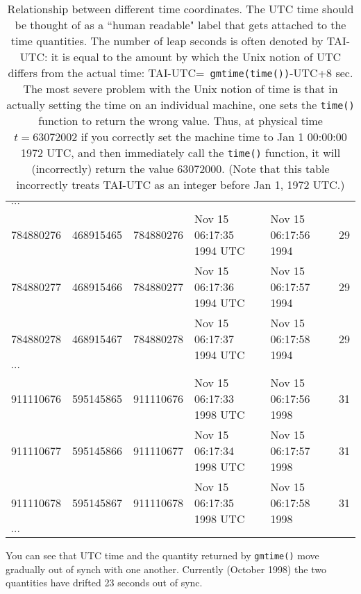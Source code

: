 \begin{table}
\begin{tabular}[]{llllll}
$\cdots$ \\
784880276	& 468915465	& 784880276	&  Nov 15 06:17:35 1994 UTC 	& Nov 15 06:17:56 1994		&	29	\\
784880277	& 468915466	& 784880277	&  Nov 15 06:17:36 1994 UTC 	& Nov 15 06:17:57 1994		&	29	\\
784880278	& 468915467	& 784880278	&  Nov 15 06:17:37 1994 UTC 	& Nov 15 06:17:58 1994		&	29	\\
$\cdots$ \\
911110676  	& 595145865	& 911110676  	&  Nov 15 06:17:33 1998 UTC 	& Nov 15 06:17:56 1998		&	31	\\
911110677  	& 595145866	& 911110677  	&  Nov 15 06:17:34 1998 UTC 	& Nov 15 06:17:57 1998		&	31	\\
911110678  	& 595145867	& 911110678  	&  Nov 15 06:17:35 1998 UTC 	& Nov 15 06:17:58 1998		&	31	\\
$\cdots$ 
\end{tabular}
\caption{\label{t:utctime} Relationship between different time
coordinates.  The UTC time should be thought of as a ``human readable"
label that gets attached to the time quantities.  The number of leap
seconds is often denoted by TAI-UTC: it is equal to the amount by
which the Unix notion of UTC differs from the actual time: TAI-UTC={\tt
gmtime(time())}-UTC+8 sec.  The most severe problem with the Unix notion
of time is that in actually setting the time on an individual machine,
one sets the {\tt time()} function to return the wrong value.  Thus,
at physical time $t=63072002$ if you correctly set the machine time to Jan 1
00:00:00 1972 UTC, and then immediately call the {\tt time()} function, it will (incorrectly)
return the value 63072000.  (Note that this table incorrectly treats
TAI-UTC as an integer before Jan 1, 1972 UTC.) }
\end{table}
You can see that UTC time and the quantity returned by {\tt gmtime()}
move gradually out of synch with one another.  Currently (October 1998)
the two quantities have drifted 23 seconds out of sync.

